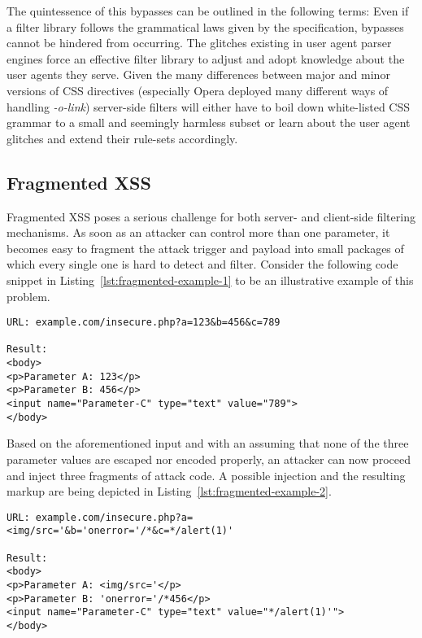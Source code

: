       The quintessence of this bypasses can be outlined in the following terms: Even if a filter library follows the grammatical laws given by the specification, bypasses cannot be hindered from occurring. The glitches existing in user agent parser engines force an effective filter library to adjust and adopt knowledge about the user agents they serve. Given the many differences between major and minor versions of CSS directives (especially Opera deployed many different ways of handling \textit{-o-link}) server-side filters will either have to boil down white-listed CSS grammar to a small and seemingly harmless subset or learn about the user agent glitches and extend their rule-sets accordingly. 

    \subsection{Fragmented XSS}
    \label{subsubsubsec:5.4.6.4.fragmented_xss}

      Fragmented XSS poses a serious challenge for both server- and client-side filtering mechanisms. As soon as an attacker can control more than one parameter, it becomes easy to fragment the attack trigger and payload into small packages of which every single one is hard to detect and filter. Consider the following code snippet in Listing~\ref{lst:fragmented-example-1} to be an illustrative example of this problem. \\

\begin{lstlisting}[label=lst:fragmented-example-1,caption=A example website using three parameters; no malicious parameters are being injected,captionpos=b]
URL: example.com/insecure.php?a=123&b=456&c=789

Result:
<body>
<p>Parameter A: 123</p>
<p>Parameter B: 456</p>
<input name="Parameter-C" type="text" value="789">
</body>
\end{lstlisting}

      Based on the aforementioned input and with an assuming that none of the three parameter values are escaped nor encoded properly, an attacker can now proceed and inject three fragments of attack code. A possible injection and the resulting markup are being depicted in Listing~\ref{lst:fragmented-example-2}.

\begin{lstlisting}[label=lst:fragmented-example-2,caption=A example website using three parameters; three malicious parameters are being injected -- initiating a fragmented XSS attack,captionpos=b]
URL: example.com/insecure.php?a=<img/src='&b='onerror='/*&c=*/alert(1)'

Result:
<body>
<p>Parameter A: <img/src='</p>
<p>Parameter B: 'onerror='/*456</p>
<input name="Parameter-C" type="text" value="*/alert(1)'">
</body>
\end{lstlisting}


